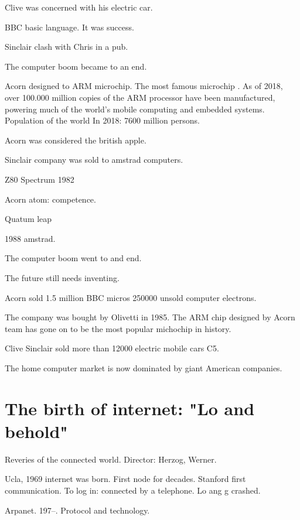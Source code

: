    Clive was concerned with his electric car. 
   
   BBC basic language. It was success. 
   
   
   Sinclair clash with Chris in a pub. 
   
   The computer boom became to an end. 
   
   Acorn designed to ARM microchip. The most famous microchip . 
   As of 2018, over 100.000 million copies of the ARM processor have been manufactured, powering much of the world's mobile computing and 
   embedded systems. Population of the world 
   In 2018: 7600 million persons. 
    
   
   Acorn was considered the british apple. 
   
   Sinclair company was sold to amstrad computers. 
   
   
    
   Z80
   Spectrum 1982 
   
   Acorn atom: competence. 
   
   
   
   Quatum leap 
   
   1988 amstrad. 
   
   The computer boom went to and end. 
   
   The future still needs inventing. 
   
   Acorn sold 1.5 million BBC micros 
   250000 unsold computer electrons. 
   
   The company was bought by Olivetti in 1985. 
   The ARM chip designed by Acorn team has gone on to be the most popular michochip in history. 
   
   Clive Sinclair sold more than 12000 electric mobile cars C5. 
   
   The home computer market is now dominated by giant American companies. 
   
   
  
   
    \section{The birth of internet: "Lo and behold"} 
    Reveries of the connected world.  
    Director: Herzog, Werner. 
    
    
    
    Ucla, 1969 internet was born. 
    First node for decades. 
    Stanford first communication. 
    To log in: connected by a telephone. Lo ang g crashed. 
    
    Arpanet. 197--. Protocol and technology. 
    
